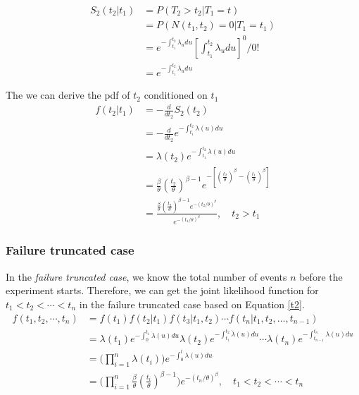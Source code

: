 \documentclass[12pt]{book}
\numberwithin{equation}{chapter}
\begin{document}
\begin{align*}
S_2(t_2 | t_1) & = P(T_2 > t_2 | T_1 = t)\\
& = P(N(t_1, t_2) = 0|T_1 = t_1) \\
& = e^{-\int_{t_1}^{t_2}\lambda_{u}du}[\int_{t_1}^{t_2}\lambda_{u}du]^0/0!\\
& = e^{-\int_{t_1}^{t_2}\lambda_{u}du}
\end{align*}

The we can derive the pdf of \(t_2\) conditioned on \(t_1\)
\begin{equation}\label{t2}
\begin{aligned}
f(t_2|t_1) & = - \frac{d}{dt_2}S_2(t_2)\\
& = - \frac{d}{dt_2}e^{-\int_{t_1}^{t_2}\lambda(u)du}\\
& = \lambda(t_2)e^{-\int_{t_1}^{t_2}\lambda(u)du}\\
& = \frac{\beta}{\theta}(\frac{t_2}{\theta})^{\beta - 1}e^{-[(\frac{t_2}{\theta})^\beta - (\frac{t_1}{\theta})^\beta]}\\
& = \frac{\frac{\beta}{\theta}(\frac{t_2}{\theta})^{\beta - 1}e^{-(t_2/\theta)^\beta }}{e^{- (t_1/\theta)^\beta}}, \quad t_2 > t_1
\end{aligned}
\end{equation}

\hypertarget{failure-truncated-case}{%
\subsubsection{Failure truncated case}\label{failure-truncated-case}}

In the \emph{failure truncated case}, we know the total number of events \(n\) before the experiment starts. Therefore, we can get the joint likelihood function for \(t_1 < t_2 < \cdots < t_n\) in the failure truncated case based on Equation \ref{t2}.
\begin{equation}\label{pdfn}
\begin{aligned}
f(t_1, t_2, \cdots, t_n) & = f(t_1)f(t_2|t_1)f(t_3|t_1, t_2) \cdots f(t_n|t_1, t_2, \dots, t_{n - 1}) \\
& = \lambda (t_1)e^{-\int_{0}^{t_1} \dot \lambda (u)du}\lambda (t_2)e^{-\int_{t_1}^{t_2} \dot \lambda (u)du}\cdots\lambda (t_n)e^{-\int_{t_{n-1}}^{t_n}\lambda (u)du}\\
& = \Big(\prod_{i=1}^n\lambda(t_i)\Big)e^{-\int_0^t\lambda(u)du}\\
& = \Big(\prod_{i=1}^n\frac{\beta}{\theta}(\frac{t_i}{\theta})^{\beta - 1}\Big)e^{-(t_n/\theta)^\beta}, \quad t_1 < t_2 < \cdots < t_n
\end{aligned}
\end{equation}
\end{document}
